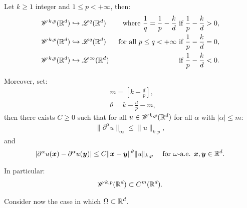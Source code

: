 \begin{corollary} \label{corollary:embedding}
    Let $k \geq 1$ integer and $1 \leq p < +\infty$, then:
    \begin{align}
        \mathscr{W}^{k, p}(\mathbb{R}^{d}) & \hookrightarrow \mathscr{L}^{q}(\mathbb{R}^{d}) &\text{ where } \frac{1}{q} = \frac{1}{p} - \frac{k}{d} \text{ if } \frac{1}{p} - \frac{k}{d} > 0, \\
        \mathscr{W}^{k, p}(\mathbb{R}^{d}) & \hookrightarrow \mathscr{L}^{q}(\mathbb{R}^{d}) &\text{ for all } p \leq q < +\infty \text{ if } \frac{1}{p} - \frac{k}{d} = 0, \\
        \mathscr{W}^{k, p}(\mathbb{R}^{d}) & \hookrightarrow \mathscr{L}^{\infty}(\mathbb{R}^{d}) & \text{ if } \frac{1}{p} - \frac{k}{d} < 0.
    \end{align}

    Moreover, set:
    \begin{align}
        & m = \left[ k - \frac{d}{p} \right], \\
        & \theta = k - \frac{d}{p} - m,
    \end{align}
    then there exists $C \geq 0$ such that for all $u \in \mathscr{W}^{k, p}(\mathbb{R}^{d})$ for all $\alpha$ with $\lvert \alpha \rvert \leq m$:
    \begin{align}
        \lVert \partial^{\alpha} u \rVert_{\infty} \leq \lVert u \rVert_{k, p},
    \end{align}
    and
    \begin{align}
        \lvert \partial^{\alpha} u(\bm{x}) - \partial^{\alpha} u(\bm{y}) \rvert &\leq C \lVert \bm{x} - \bm{y} \rVert^{\theta} \lVert u \rVert_{k, p} &\text{ for } \omega \text{-a.e. } \bm{x}, \bm{y} \in \mathbb{R}^{d}.
    \end{align}

    In particular:
    \begin{align}
        \mathscr{W}^{k, p}(\mathbb{R}^{d}) \subset C^m(\mathbb{R}^{d}).
    \end{align}
\end{corollary}

Consider now the case in which $\Omega \subset \mathbb{R}^{d}$.

